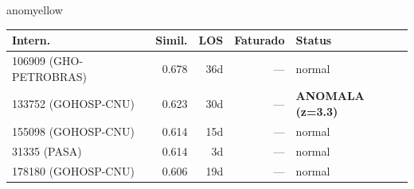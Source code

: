 \documentclass[a4paper,10pt]{article}
\begin{document}
\begin{anomalycard}[Internacao 185366 | PASA | MODERADO (z=2.66)]{anomyellow}
\begin{tabular}{l r r r l}\toprule\textbf{Intern.} & \textbf{Simil.} & \textbf{LOS} & \textbf{Faturado} & \textbf{Status} \\\midrule
106909 (GHO-PETROBRAS) & 0.678 & 36d & --- & \textcolor{jcubeblue}{normal} \\
133752 (GOHOSP-CNU) & 0.623 & 30d & --- & \textcolor{anomred}{\textbf{ANOMALA (z=3.3)}} \\
155098 (GOHOSP-CNU) & 0.614 & 15d & --- & \textcolor{jcubeblue}{normal} \\
31335 (PASA) & 0.614 & 3d & --- & \textcolor{jcubeblue}{normal} \\
178180 (GOHOSP-CNU) & 0.606 & 19d & --- & \textcolor{jcubeblue}{normal} \\
\bottomrule\end{tabular}


\end{anomalycard}

\newpage
\end{document}
